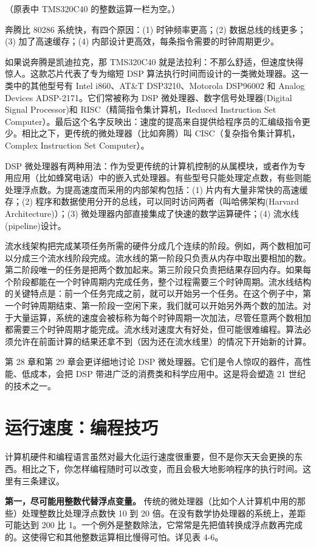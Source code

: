 （原表中 TMS320C40 的整数运算一栏为空。）

奔腾比 80286 系统快，有四个原因：(1) 时钟频率更高；(2)
数据总线的线更多；(3) 加了高速缓存；(4)
内部设计更高效，每条指令需要的时钟周期更少。

如果说奔腾是凯迪拉克，那 TMS320C40
就是法拉利：不那么舒适，但速度快得惊人。这款芯片代表了专为缩短 DSP
算法执行时间而设计的一类微处理器。这一类中的其他型号有 Intel i860、AT\&T
DSP3210、Motorola DSP96002 和 Analog Devices ADSP-2171。它们常被称为 DSP
微处理器、数字信号处理器(Digital Signal Processor)和
RISC（精简指令集计算机，Reduced Instruction Set
Computer）。最后这个名字反映出：速度的提高来自提供给程序员的汇编级指令更少。相比之下，更传统的微处理器（比如奔腾）叫
CISC（复杂指令集计算机，Complex Instruction Set Computer）。

DSP
微处理器有两种用法：作为受更传统的计算机控制的从属模块，或者作为专用应用（比如蜂窝电话）中的嵌入式处理器。有些型号只能处理定点数，有些则能处理浮点数。为提高速度而采用的内部架构包括：(1)
片内有大量非常快的高速缓存；(2)
程序和数据使用分开的总线，可以同时访问两者（叫哈佛架构(Harvard
Architecture)）；(3) 微处理器内部直接集成了快速的数学运算硬件；(4)
流水线(pipeline)设计。

流水线架构把完成某项任务所需的硬件分成几个连续的阶段。例如，两个数相加可以分成三个流水线阶段完成。流水线的第一阶段只负责从内存中取出要相加的数。第二阶段唯一的任务是把两个数加起来。第三阶段只负责把结果存回内存。如果每个阶段都能在一个时钟周期内完成任务，整个过程需要三个时钟周期。流水线结构的关键特点是：前一个任务完成之前，就可以开始另一个任务。在这个例子中，第一个时钟周期结束、第一阶段一空闲下来，我们就可以开始另外两个数的加法。对于大量运算，系统的速度会被标称为每个时钟周期一次加法，尽管任意两个数相加都需要三个时钟周期才能完成。流水线对速度大有好处，但可能很难编程。算法必须允许在前面计算的结果还拿不到（因为还在流水线里）的情况下开始新的计算。

第 28 章和第 29 章会更详细地讨论 DSP
微处理器。它们是令人惊叹的器件，高性能、低成本，会把 DSP
带进广泛的消费类和科学应用中。这是将会塑造 21 世纪的技术之一。

\section{运行速度：编程技巧}

计算机硬件和编程语言虽然对最大化运行速度很重要，但不是你天天会更换的东西。相比之下，你怎样编程随时可以改变，而且会极大地影响程序的执行时间。这里有三条建议。

\textbf{第一，尽可能用整数代替浮点变量。}
传统的微处理器（比如个人计算机中用的那些）处理整数比处理浮点数快 10 到
20 倍。在没有数学协处理器的系统上，差距可能达到 200 比
1。一个例外是整数除法，它常常是先把值转换成浮点数再完成的。这使得它和其他整数运算相比慢得可怕。详见表
4-6。

